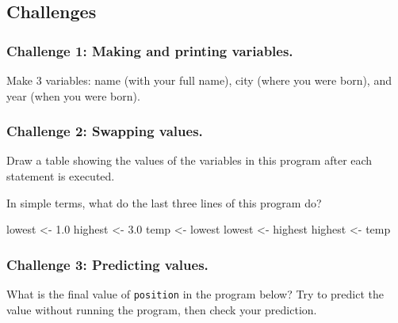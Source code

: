 \documentclass[
]{book}
\newenvironment{Shaded}{\begin{snugshade}}{\end{snugshade}}
\newcommand{\FloatTok}[1]{\textcolor[rgb]{0.00,0.00,0.81}{#1}}
\newcommand{\NormalTok}[1]{#1}
\newcommand{\StringTok}[1]{\textcolor[rgb]{0.31,0.60,0.02}{#1}}
\begin{document}
\hypertarget{challenges-1}{%
\subsection{Challenges}\label{challenges-1}}

\hypertarget{challenge-1-making-and-printing-variables.}{%
\subsubsection*{Challenge 1: Making and printing variables.}\label{challenge-1-making-and-printing-variables.}}

Make 3 variables: name (with your full name), city (where you were born), and year (when you were born).

\hypertarget{challenge-2-swapping-values.}{%
\subsubsection*{Challenge 2: Swapping values.}\label{challenge-2-swapping-values.}}

Draw a table showing the values of the variables in this program after each statement is executed.

In simple terms, what do the last three lines of this program do?

\begin{Shaded}
\begin{Highlighting}[]
\NormalTok{lowest <-}\StringTok{ }\FloatTok{1.0}
\NormalTok{highest <-}\StringTok{ }\FloatTok{3.0}
\NormalTok{temp <-}\StringTok{ }\NormalTok{lowest}
\NormalTok{lowest <-}\StringTok{ }\NormalTok{highest}
\NormalTok{highest <-}\StringTok{ }\NormalTok{temp}
\end{Highlighting}
\end{Shaded}

\hypertarget{challenge-3-predicting-values.}{%
\subsubsection*{Challenge 3: Predicting values.}\label{challenge-3-predicting-values.}}

What is the final value of \texttt{position} in the program below? Try to predict the value without running the program, then check your prediction.
\end{document}

